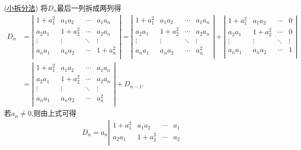 \documentclass[lang=cn,newtx,10pt,scheme=chinese]{elegantbook}
\begin{document}
\begin{solution}
    (\hyperlink{小拆分法}{小拆分法})
    将$D_n$最后一列拆成两列得
    \begin{align*}
        D_n&=\left| \begin{matrix}
            1+a_{1}^{2}&		a_1a_2&		\cdots&		a_1a_n\\
            a_2a_1&		1+a_{2}^{2}&		\cdots&		a_2a_n\\
            \vdots&		\vdots&		\ddots&		\vdots\\
            a_na_1&		a_na_2&		\cdots&		1+a_{n}^{2}\\
        \end{matrix} \right|=\left| \begin{matrix}
            1+a_{1}^{2}&		a_1a_2&		\cdots&		a_1a_n\\
            a_2a_1&		1+a_{2}^{2}&		\cdots&		a_2a_n\\
            \vdots&		\vdots&		\ddots&		\vdots\\
            a_na_1&		a_na_2&		\cdots&		a_{n}^{2}\\
        \end{matrix} \right|+\left| \begin{matrix}
            1+a_{1}^{2}&		a_1a_2&		\cdots&		0\\
            a_2a_1&		1+a_{2}^{2}&		\cdots&		0\\
            \vdots&		\vdots&		\ddots&		\vdots\\
            a_na_1&		a_na_2&		\cdots&		1\\
        \end{matrix} \right|
        \\
        &=\left| \begin{matrix}
            1+a_{1}^{2}&		a_1a_2&		\cdots&		a_1a_n\\
            a_2a_1&		1+a_{2}^{2}&		\cdots&		a_2a_n\\
            \vdots&		\vdots&		\ddots&		\vdots\\
            a_na_1&		a_na_2&		\cdots&		a_{n}^{2}\\
        \end{matrix} \right|+D_{n-1}.
\end{align*}
若$a_n\ne0$,则由上式可得
\begin{align*}
    D_n=a_n\left| \begin{matrix}
        1+a_{1}^{2}&		a_1a_2&		\cdots&		a_1\\
        a_2a_1&		1+a_{2}^{2}&		\cdots&		a_2\\

\end{matrix}
\end{align*}
\end{solution}
\end{document}
